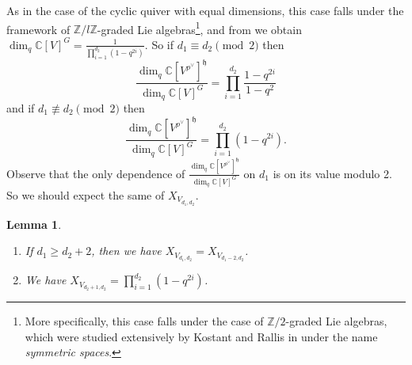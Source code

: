 \documentclass[12pt]{article}
\newcommand{\Z}{\mathbb{Z}}
\newcommand{\C}{\mathbb{C}}
\newtheorem{lemma}[theorem]{Lemma}
\theoremstyle{definition}
\theoremstyle{remark}
\newcommand{\h}{\mathfrak{h}}
\begin{document}
As in the case of the cyclic quiver with equal dimensions, this case falls under the framework of $\Z/l\Z$-graded Lie algebras\footnote{More specifically, this case falls under the case of $\Z/2$-graded Lie algebras, which were studied extensively by Kostant and Rallis in \cite{Kostant1971OrbitsAR} under the name \emph{symmetric spaces}.}, and from \cite{vinberg} we obtain $\dim_q\C[V]^G=\frac{1}{\prod_{i=1}^{d_2}(1-q^{2i})}$. So if $d_1\equiv d_2\pmod{2}$ then
\[\frac{\dim_q\C[V^{\rho^\vee}]^\h}{\dim_q\C[V]^G}=\prod_{i=1}^{d_2}\frac{1-q^{2i}}{1-q^2}\]
and if $d_1\not\equiv d_2\pmod{2}$ then
\[\frac{\dim_q\C[V^{\rho^\vee}]^\h}{\dim_q\C[V]^G}=\prod_{i=1}^{d_2}(1-q^{2i}).\]
Observe that the only dependence of $\frac{\dim_q\C[V^{\rho^\vee}]^\h}{\dim_q\C[V]^G}$ on $d_1$ is on its value modulo 2. So we should expect the same of $X_{V_{d_1,d_2}}$.

\begin{lemma}\label{lem:2vertex}
    \begin{enumerate}
        \item If $d_1\geq d_2+2$, then we have $X_{V_{d_1,d_2}}=X_{V_{d_1-2,d_2}}$.\label{lem:2vertex1}
        \item We have $X_{V_{d_2+1,d_2}}=\prod_{i=1}^{d_2}(1-q^{2i})$.\label{lem:2vertex2}
    \end{enumerate}
\end{lemma}
\end{document}
